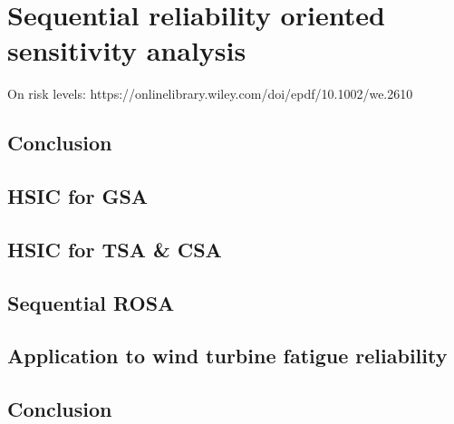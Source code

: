 \cleardoublepage
\chapter{Sequential reliability oriented sensitivity analysis}
\label{chpt:7}
\hfill
\localtableofcontents
\newpage

On risk levels: https://onlinelibrary.wiley.com/doi/epdf/10.1002/we.2610


\section{Conclusion}
\section{HSIC for GSA}
\section{HSIC for TSA \& CSA}
\section{Sequential ROSA}
\section{Application to wind turbine fatigue reliability}
\section{Conclusion}